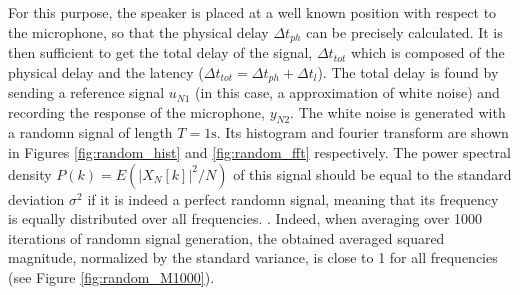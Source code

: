 For this purpose, the speaker is placed at a well known position with respect to the microphone, so that the physical delay $\Delta t_{ph}$ can be precisely calculated. 
It is then sufficient to get the total delay of the signal, $\Delta t_{tot}$ which is composed of the physical delay and the latency ($\Delta t_{tot}=\Delta t_{ph}+\Delta t_{l}$). 
The total delay is found by sending a reference signal $u_{N1}$ (in this case, a approximation of white noise) and recording the response of the microphone, $y_{N2}$. 
The white noise is generated with a randomn signal of length $T=1\text{s}$. Its histogram and fourier transform are shown in Figures \ref{fig:random_hist} and \ref{fig:random_fft} respectively. 
The power spectral density $P(k)=E(|X_N[k]|^2/N)$ of this signal should be equal to the standard deviation $\sigma^2$ if it is indeed a perfect randomn signal, meaning that its frequency is equally distributed over all frequencies. \cite{Vetterli}.
Indeed, when averaging over 1000 iterations of randomn signal generation, the obtained averaged squared magnitude, normalized by the standard variance, is close to 1 for all frequencies (see Figure \ref{fig:random_M1000}).
